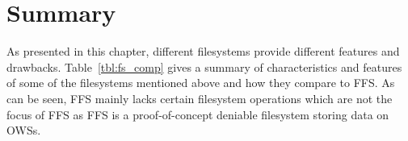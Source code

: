 
\section{Summary} %


As presented in this chapter, different filesystems provide different features and drawbacks. Table~\ref{tbl:fs_comp} gives a summary of characteristics and features of some of the filesystems mentioned above and how they compare to \gls{FFS}. As can be seen, \gls{FFS} mainly lacks certain filesystem operations which are not the focus of \gls{FFS} as \gls{FFS} is a \mbox{proof-of-concept} deniable filesystem storing data on \gls{OWS}s. 

